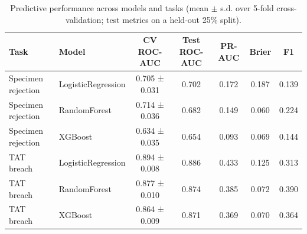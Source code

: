 \begin{table}[!t]
\centering
\caption{Predictive performance across models and tasks (mean $\pm$ s.d. over 5-fold cross-validation; test metrics on a held-out 25\% split).}
\label{tab:models}
\begin{tabular}{llccccc}
\hline
Task & Model & CV ROC-AUC & Test ROC-AUC & PR-AUC & Brier & F1 \\
\hline
Specimen rejection & LogisticRegression & 0.705 ± 0.031 & 0.702 & 0.172 & 0.187 & 0.139 \\
Specimen rejection & RandomForest & 0.714 ± 0.036 & 0.682 & 0.149 & 0.060 & 0.224 \\
Specimen rejection & XGBoost & 0.634 ± 0.035 & 0.654 & 0.093 & 0.069 & 0.144 \\
TAT breach & LogisticRegression & 0.894 ± 0.008 & 0.886 & 0.433 & 0.125 & 0.313 \\
TAT breach & RandomForest & 0.877 ± 0.010 & 0.874 & 0.385 & 0.072 & 0.390 \\
TAT breach & XGBoost & 0.864 ± 0.009 & 0.871 & 0.369 & 0.070 & 0.364 \\
\hline
\end{tabular}
\end{table}
